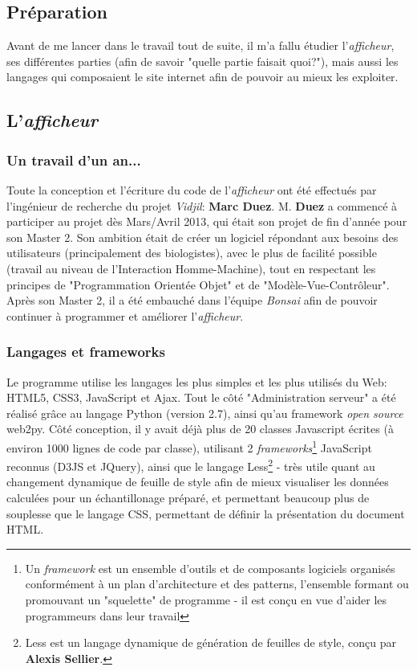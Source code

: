 \documentclass[12pt]{report}
\begin{document}
\begin{spacing}{1.2}
\chapter{Préparation}

Avant de me lancer dans le travail tout de suite, il m'a fallu étudier l'\textit{afficheur}, ses différentes parties (afin de savoir "quelle partie faisait quoi?"), mais aussi les langages qui composaient le site internet afin de pouvoir au mieux les exploiter.

\section{L'\textit{afficheur}}

\subsection{Un travail d'un an...}
Toute la conception et l'écriture du code de l'\textit{afficheur} ont été effectués par l'ingénieur de recherche du projet \textit{Vidjil}: \textbf{Marc Duez}.
\newline
M. \textbf{Duez} a commencé à participer au projet dès Mars/Avril 2013, qui était son projet de fin d'année pour son Master 2.
\newline
Son ambition était de créer un logiciel répondant aux besoins des utilisateurs (principalement des biologistes), avec le plus de facilité possible (travail au niveau de l'Interaction Homme-Machine), tout en respectant les principes de "Programmation Orientée Objet" et de "Modèle-Vue-Contrôleur".
\newline
Après son Master 2, il a été embauché dans l'équipe \textit{Bonsai} afin de pouvoir continuer à programmer et améliorer l'\textit{afficheur}.

\subsection{Langages et frameworks}
Le programme utilise les langages les plus simples et les plus utilisés du Web: HTML5, CSS3, JavaScript et Ajax.
\newline
Tout le côté "Administration serveur" a été réalisé grâce au langage Python (version 2.7), ainsi qu'au framework \textit{open source} web2py.
\newline
Côté conception, il y avait déjà plus de 20 classes Javascript écrites (à environ 1000 lignes de code par classe), utilisant 2 \textit{frameworks}\footnote{Un \textit{framework} est un ensemble d'outils et de composants logiciels organisés conformément à un plan d'architecture et des patterns, l'ensemble formant ou promouvant un "squelette" de programme - il est conçu en vue d'aider les programmeurs dans leur travail} JavaScript reconnus (D3JS et JQuery), ainsi que le langage Less\footnote{Less est un langage dynamique de génération de feuilles de style, conçu par \textbf{Alexis Sellier}.} - très utile quant au changement dynamique de feuille de style afin de mieux visualiser les données calculées pour un échantillonage préparé, et permettant beaucoup plus de souplesse que le langage CSS, permettant de définir la présentation du document HTML.


\end{spacing}
\end{document}
